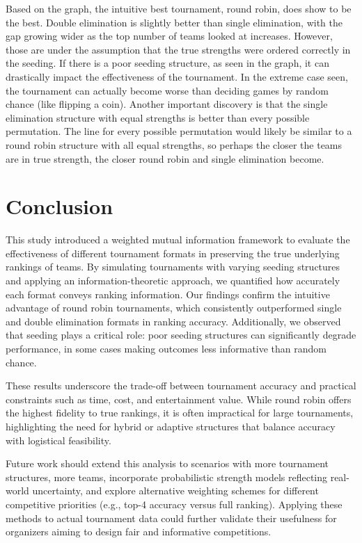 \documentclass[
  12pt,
]{article}
\begin{document}
Based on the graph, the intuitive best tournament, round robin, does
show to be the best. Double elimination is slightly better than single
elimination, with the gap growing wider as the top number of teams
looked at increases. However, those are under the assumption that the
true strengths were ordered correctly in the seeding. If there is a poor
seeding structure, as seen in the graph, it can drastically impact the
effectiveness of the tournament. In the extreme case seen, the
tournament can actually become worse than deciding games by random
chance (like flipping a coin). Another important discovery is that the
single elimination structure with equal strengths is better than every
possible permutation. The line for every possible permutation would
likely be similar to a round robin structure with all equal strengths,
so perhaps the closer the teams are in true strength, the closer round
robin and single elimination become.

\section{Conclusion}\label{sec:conclusion}

This study introduced a weighted mutual information framework to
evaluate the effectiveness of different tournament formats in preserving
the true underlying rankings of teams. By simulating tournaments with
varying seeding structures and applying an information-theoretic
approach, we quantified how accurately each format conveys ranking
information. Our findings confirm the intuitive advantage of round robin
tournaments, which consistently outperformed single and double
elimination formats in ranking accuracy. Additionally, we observed that
seeding plays a critical role: poor seeding structures can significantly
degrade performance, in some cases making outcomes less informative than
random chance.

These results underscore the trade-off between tournament accuracy and
practical constraints such as time, cost, and entertainment value. While
round robin offers the highest fidelity to true rankings, it is often
impractical for large tournaments, highlighting the need for hybrid or
adaptive structures that balance accuracy with logistical feasibility.

Future work should extend this analysis to scenarios with more
tournament structures, more teams, incorporate probabilistic strength
models reflecting real-world uncertainty, and explore alternative
weighting schemes for different competitive priorities (e.g., top-4
accuracy versus full ranking). Applying these methods to actual
tournament data could further validate their usefulness for organizers
aiming to design fair and informative competitions.
\end{document}
